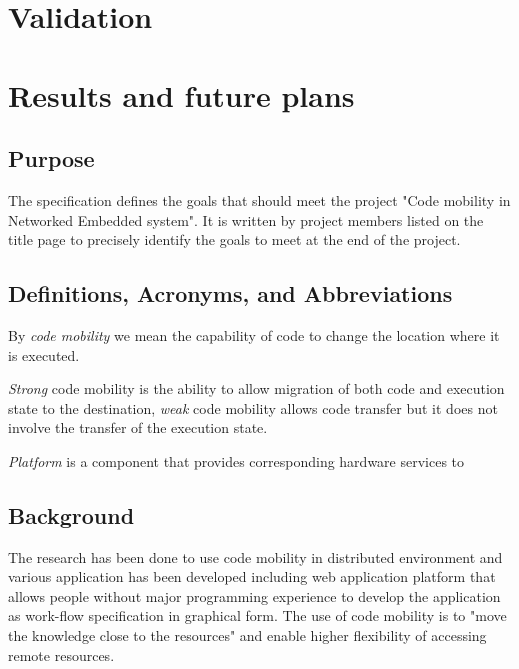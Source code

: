 \documentclass{scrreprt}
\begin{document}
\chapter{Validation}

\chapter{Results and future plans}




	\section{Purpose}

The specification defines the goals that should meet the project "Code mobility in Networked Embedded system". It is written by project members listed on the title page to precisely identify the goals to meet at the end of the project.
\vspace{0.1in}
\noindent


	\section{Definitions, Acronyms, and Abbreviations}

By \emph{code mobility} we mean the capability of code to change the location where it is executed.

\vspace{0.1in}
\noindent
\emph{Strong} code mobility is the ability to allow migration of both code and execution state to the destination, \emph{weak} code mobility allows code transfer but it does not involve the transfer of the execution state.

\vspace{0.1in}
\noindent
\emph{Platform} is a component that provides corresponding hardware services to 

	\section{Background}

\noindent
The research has been done to use code mobility in distributed environment \cite{Bart1} and various application has been developed including \cite{Bart2} web application platform that allows people without major programming experience to develop the application as work-flow specification in graphical form. The use of code mobility is to "move the knowledge close to the resources" \cite{Picco} and enable higher flexibility of accessing remote resources.
\end{document}
